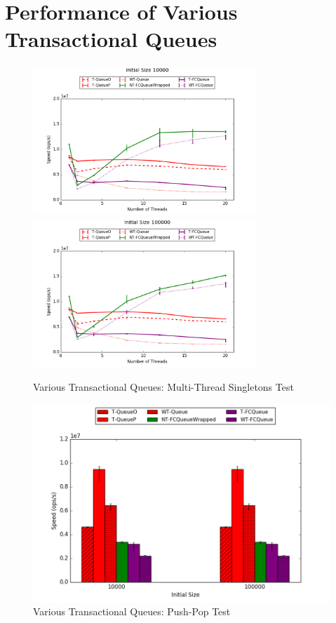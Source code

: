 \section{Performance of Various Transactional Queues}
\begin{figure}[H]
    \centering
    \includegraphics[width=0.75\textwidth]{fcqueues/allQ:RandSingleOps10000.png}
    \vspace{12pt}
    \includegraphics[width=0.75\textwidth]{fcqueues/allQ:RandSingleOps100000.png}
    \caption{Various Transactional Queues: Multi-Thread Singletons Test}
\end{figure}
\begin{figure}[H]
    \centering
    \includegraphics[width=\textwidth]{fcqueues/allQ:PushPop.png}
    \caption{Various Transactional Queues: Push-Pop Test}
\end{figure}

